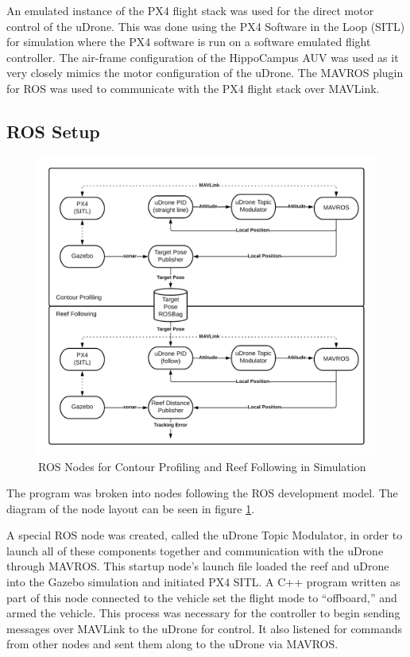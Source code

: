 An emulated instance of the PX4 flight stack was used for the direct motor control of the uDrone. This was done using the PX4 Software in the Loop (SITL) for simulation where the PX4 software is run on a software emulated flight controller. The air-frame configuration of the HippoCampus \textmu AUV was used as it very closely mimics the motor configuration of the uDrone. The MAVROS plugin for ROS was used to communicate with the PX4 flight stack over MAVLink. 

\subsection{ROS Setup}
\begin{figure}[h]
\includegraphics[width=\maxwidth{\textwidth}]{img/ros.png}
\caption{ROS Nodes for Contour Profiling and Reef Following in Simulation}
\label{ros}
\end{figure}

The program was broken into nodes following the ROS development model. The diagram of the node layout can be seen in figure \ref{ros}.

A special ROS node was created, called the uDrone Topic Modulator, in order to launch all of these components together and communication with the uDrone through MAVROS. This startup node’s launch file loaded the reef and uDrone into the Gazebo simulation and initiated PX4 SITL. A C++ program written as part of this node connected to the vehicle set the flight mode to “offboard,” and armed the vehicle. This process was necessary for the controller to begin sending messages over MAVLink to the uDrone for control. It also listened for commands from other nodes and sent them along to the uDrone via MAVROS. 

